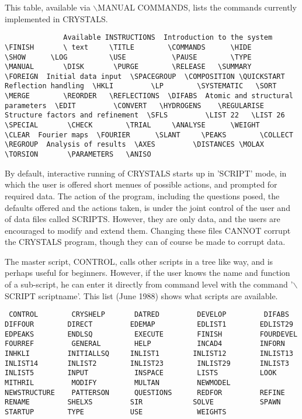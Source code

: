 \documentclass[10pt,a4paper]{report}
\begin{document}
This table, available via $\backslash$MANUAL COMMANDS, lists the commands currently implemented in CRYSTALS.\small\begin{verbatim}              Available INSTRUCTIONS  Introduction to the system  \FINISH       \ text     \TITLE        \COMMANDS      \HIDE         \SHOW      \LOG          \USE           \PAUSE        \TYPE      \MANUAL       \DISK       \PURGE        \RELEASE   \SUMMARY      \FOREIGN  Initial data input  \SPACEGROUP  \COMPOSITION \QUICKSTART  Reflection handling  \HKLI         \LP        \SYSTEMATIC   \SORT          \MERGE        \REORDER   \REFLECTIONS  \DIFABS  Atomic and structural parameters  \EDIT         \CONVERT   \HYDROGENS    \REGULARISE  Structure factors and refinement  \SFLS         \LIST 22   \LIST 26      \SPECIAL       \CHECK        \TRIAL     \ANALYSE      \WEIGHT        \CLEAR  Fourier maps  \FOURIER      \SLANT     \PEAKS        \COLLECT       \REGROUP  Analysis of results  \AXES         \DISTANCES \MOLAX        \TORSION       \PARAMETERS   \ANISO\end{verbatim}\normalsize



\bigskip{}



 

By default, interactive running of CRYSTALS starts up in 'SCRIPT' mode, in which the user is offered short menues of possible actions, and prompted for required data. The action of the program, including the  questions posed, the defaults offered and the actions taken, is under the joint control of the user and of data files called SCRIPTS. However, they are only data, and the users are encouraged to modify and extend them. Changing these files CANNOT corrupt the CRYSTALS program, though they can of course be made to corrupt data.

The master script, CONTROL, calls other scripts in a tree like way, and is perhaps useful for beginners. However, if the user knows the name and function of a sub-script, he can enter it directly from command level with the command '$\backslash$SCRIPT scriptname'. This list (June 1988) shows what scripts are available.\small\begin{verbatim} CONTROL        CRYSHELP       DATRED         DEVELOP         DIFABS         DIFFOUR        DIRECT         EDEMAP          EDLIST1        EDLIST29       EDPEAKS        ENDLSQ          EXECUTE        FINISH         FOURDEVEL      FOURREF         GENERAL        HELP           INCAD4         INFORN          INHKLI         INITIALLSQ     INLIST1        INLIST12        INLIST13       INLIST14       INLIST2        INLIST23        INLIST29       INLIST3        INLIST5        INPUT           INSPACE        LISTS          LOOK           MITHRIL         MODIFY         MULTAN         NEWMODEL       NEWSTRUCTURE    PATTERSON      QUESTIONS      REDFOR         REFINE          RENAME         SHELXS         SIR            SOLVE           SPAWN          STARTUP        TYPE           USE             WEIGHTS        \end{verbatim}\normalsize
\end{document}

